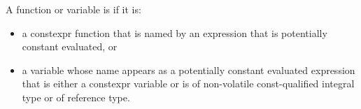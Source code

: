 %
%
A function or variable is
if it is:

\begin{itemize}
\item
a constexpr function that is named by an expression
that is potentially constant evaluated, or

\item
a variable whose name appears as a potentially constant evaluated expression
that is either a constexpr variable or
is of non-volatile const-qualified integral type or of reference type.
\end{itemize}

